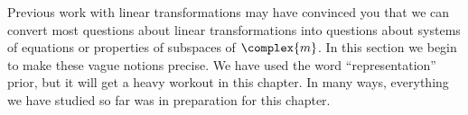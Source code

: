 Previous work with linear transformations may have convinced you that we can convert most questions about linear transformations into questions about systems of equations or properties of subspaces of $\complex{m}$.  In this section we begin to make these vague notions precise.   We have used the word ``representation'' prior, but it will get a heavy workout in this chapter.  In many ways, everything we have studied so far was in preparation for this chapter.
